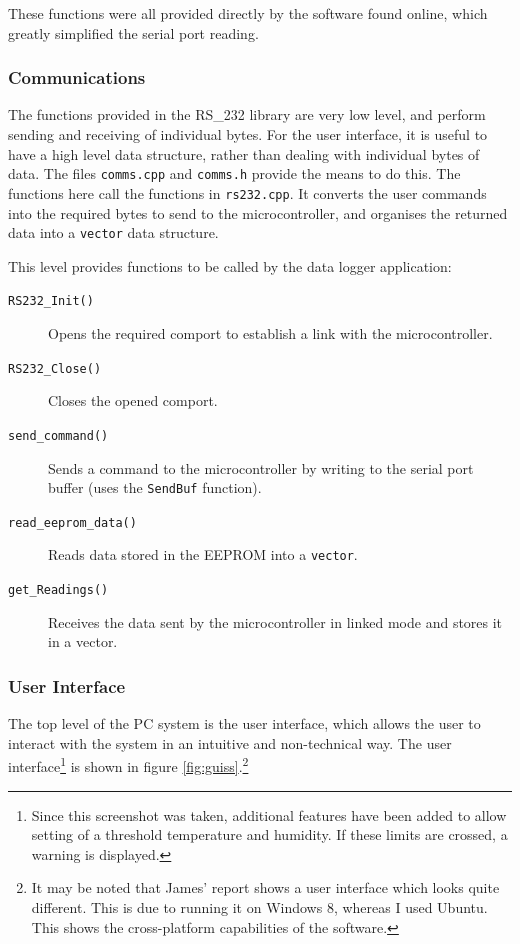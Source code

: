 \documentclass[a4paper,10pt]{article}  %
\begin{document}
These functions were all provided directly by the software found
online, which greatly simplified the serial port reading.

\subsubsection{Communications}

The functions provided in the RS\_232 library are very low level, and
perform sending and receiving of individual bytes. For the user
interface, it is useful to have a high level data structure, rather
than dealing with individual bytes of data. The files
\texttt{comms.cpp} and \texttt{comms.h} provide the means to do
this. The functions here call the functions in \texttt{rs232.cpp}. It
converts the user commands into the required bytes to send to the
microcontroller, and organises the returned data into a
\texttt{vector} data structure.

This level provides functions to be called by the data logger
application:
\begin{description}
  \item[\texttt{RS232\_Init()}] Opens the required comport to
    establish a link with the microcontroller.
  \item[\texttt{RS232\_Close()}] Closes the opened comport.
  \item[\texttt{send\_command()}] Sends a command to the
    microcontroller by writing to the serial port buffer (uses the
    \texttt{SendBuf} function).
  \item[\texttt{read\_eeprom\_data()}] Reads data stored in the EEPROM
    into a \texttt{vector}.
  \item[\texttt{get\_Readings()}] Receives the data sent by the
    microcontroller in linked mode and stores it in a vector.
\end{description}

\subsubsection{User Interface}

The top level of the PC system is the user interface, which allows the
user to interact with the system in an intuitive and non-technical
way. The user interface\footnote{Since this screenshot was taken,
  additional features have been added to allow setting of a threshold
  temperature and humidity. If these limits are crossed, a warning is
  displayed.} is shown in figure \ref{fig:guiss}.\footnote{It may be
  noted that James' report shows a user interface which looks quite
  different. This is due to running it on Windows 8, whereas I used
  Ubuntu. This shows the cross-platform capabilities of the software.}
\end{document}
